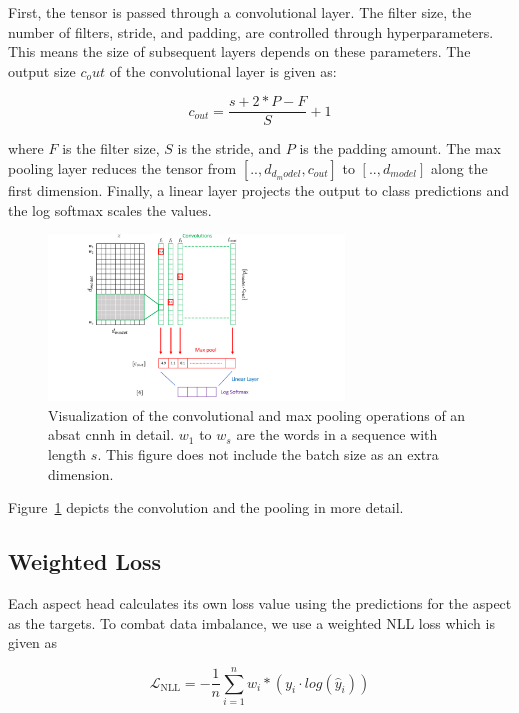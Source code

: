 First, the tensor is passed through a convolutional layer. The filter size, the number of filters, stride, and padding, are controlled through hyperparameters. This means the size of subsequent layers depends on these parameters. The output size $c_out$ of the convolutional layer is given as:

\begin{equation}
    c_{out} = \frac{s+2*P-F}{S} + 1
\end{equation}

where $F$ is the filter size, $S$ is the stride, and $P$ is the padding amount. The max pooling layer reduces the tensor from $[.., d_{d_model}, c_{out}]$ to $[.., d_{model}]$ along the first dimension. Finally, a linear layer projects the output to class predictions and the log softmax scales the values.
\medskip

\begin{figure}[htp]
    \centering
    \includegraphics[width=0.7\textwidth]{figures/04_method/04_ch2}
    \caption{Visualization of the convolutional and max pooling operations of an \gls{absat} \gls{cnnh} in detail. $w_1$ to $w_s$ are the words in a sequence with length $s$. This figure does not include the batch size as an extra dimension.}
    \label{fig:04_ch2}
\end{figure}

Figure~\ref{fig:04_ch2} depicts the convolution and the pooling in more detail.

\subsection{Weighted Loss}

Each aspect head calculates its own loss value using the predictions for the aspect as the targets. To combat data imbalance, we use a weighted NLL loss which is given as

\begin{equation}
\mathcal{L}_\text{NLL}=-\frac{1}{n}\sum_{i=1}^{n} w_i * (y_i \cdot log(\hat{y}_i))
\label{eq:04_nll}
\end{equation}

